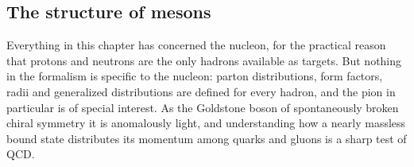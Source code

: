 \FloatBarrier

\subsection{The structure of mesons}
\label{subsec:meson-structure}

Everything in this chapter has concerned the nucleon, for the practical reason that
protons and neutrons are the only hadrons available as targets. But nothing in the
formalism is specific to the nucleon: parton distributions, form factors, radii and
generalized distributions are defined for every hadron, and the pion in particular is of
special interest. As the Goldstone boson of spontaneously broken chiral symmetry it is
anomalously light, and understanding how a nearly massless bound state distributes its
momentum among quarks and gluons is a sharp test of QCD.

